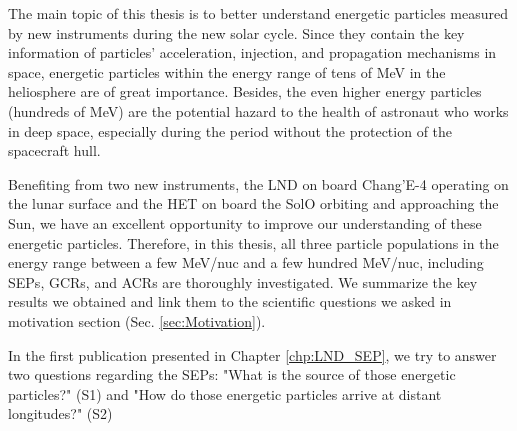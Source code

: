

The main topic of this thesis is to better understand energetic particles measured by new instruments during the new solar cycle. 
Since they contain the key information of particles' acceleration, injection, and propagation mechanisms in space, 
energetic particles within the energy range of tens of MeV in the heliosphere are of great importance. Besides, the even higher energy particles (hundreds of MeV) are the potential hazard to the health of astronaut who works in deep space, especially during the period without the protection of the spacecraft hull.

Benefiting from two new instruments, the \ac{LND} on board Chang'E-4 operating on the lunar surface and the \ac{HET} on board the \ac{SolO} orbiting and approaching the Sun, we have an excellent opportunity to improve our understanding of these energetic particles.
Therefore, in this thesis, all three particle populations in the energy range between a few MeV/nuc and a few hundred MeV/nuc, including \acp{SEP}, \acp{GCR}, and \acp{ACR} are thoroughly investigated. We summarize the key results we obtained and link them to the scientific questions we asked in motivation section (Sec. \ref{sec:Motivation}). 


In the first publication presented in Chapter \ref{chp:LND_SEP}, we try to answer two questions regarding the \acp{SEP}: "What is the source of those energetic particles?" (S1) and "How do those energetic particles arrive at distant longitudes?" (S2)
 
